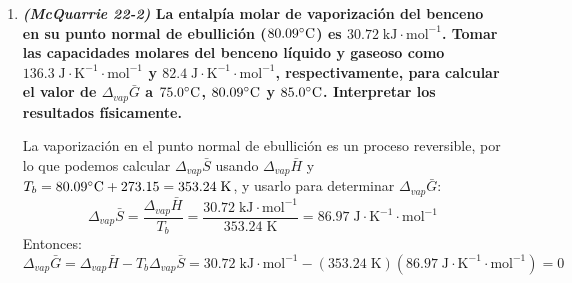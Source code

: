 \documentclass[a4paper,12pt]{article}
\begin{document}
\begin{enumerate}
El signo positivo de la entalp\'ia molar est\'andar indica que el proceso de desnaturalizaci\'on es endot\'ermico, es decir, absorbe energ\'ia en forma de calor mientras sucede, lo que indica que en t\'erminos energ\'eticos, el sistema desnaturalizado posee m\'as energ\'ia que en estado nativo. El signo positivo de la entrop\'ia molar est\'andar indica que el proceso de desnaturalizaci\'on aumenta la entrop\'ia del sistema (est\'a m\'as ``desordenado"). Como no cambiar\'ia de f\'ormula molecular, probablemente posee menos rigidez o es menos compacto en su estado desnaturalizado que en estado nativo. Las magnitudes se pueden comparar entre s\'i para indicar que el aumento de entrop\'ia no es tanto como el aumento de energ\'ia del sistema. 

Como ambos son positivos, la reacci\'on es espont\'anea cuando $T\Delta S>\Delta H$, es decir, a altas temperaturas. La temperatura que establece el l\'imite a partir del cual el proceso se hace espont\'aneo es la temperatura a la cual est\'a en equilibrio, es decir:
$$\Delta G=0\;\Rightarrow\; 0=\Delta H-T\Delta S\;\rightarrow\;T\Delta S=\Delta H$$
Despejando para $T$:
$$T=\frac{\Delta H}{\Delta S}=\frac{512\;\mbox{kJ}\cdot\mbox{mol}^{-1}}{1.60\;\mbox{kJ}\cdot\mbox{K}^{-1}\cdot\mbox{mol}^{-1}}=320\;\mbox{K}$$

 \item \textbf{\textit{(McQuarrie 22-2)} La entalp\'ia molar de vaporizaci\'on del benceno en su punto normal de ebullici\'on ($80.09\celsius$) es $30.72\;\mbox{kJ}\cdot\mbox{mol}^{-1}$. Tomar las capacidades molares del benceno l\'iquido y gaseoso como $136.3\;\mbox{J}\cdot\mbox{K}^{-1}\cdot\mbox{mol}^{-1}$ y $82.4\;\mbox{J}\cdot\mbox{K}^{-1}\cdot\mbox{mol}^{-1}$, respectivamente, para calcular el valor de $\Delta_{vap}\bar{G}$ a $75.0\celsius$, $80.09\celsius$ y $85.0\celsius$. Interpretar los resultados f\'isicamente.} %

La vaporizaci\'on en el punto normal de ebullici\'on es un proceso reversible, por lo que podemos calcular $\Delta_{vap}\bar{S}$ usando $\Delta_{vap}\bar{H}$ y $T_{b}=80.09\celsius+273.15=353.24\;\mbox{K}$, y usarlo para determinar $\Delta_{vap}\bar{G}$:
$$\Delta_{vap}\bar{S}=\frac{\Delta_{vap}\bar{H}}{T_b}=\frac{30.72\;\mbox{kJ}\cdot\mbox{mol}^{-1}}{353.24\;\mbox{K}}=86.97\;\mbox{J}\cdot\mbox{K}^{-1}\cdot\mbox{mol}^{-1}$$
Entonces:
$$\Delta_{vap}\bar{G}=\Delta_{vap}\bar{H}-T_b\Delta_{vap}\bar{S}=30.72\;\mbox{kJ}\cdot\mbox{mol}^{-1}-(353.24\;\mbox{K})(86.97\;\mbox{J}\cdot\mbox{K}^{-1}\cdot\mbox{mol}^{-1})=0$$


\end{enumerate}
\end{document}
